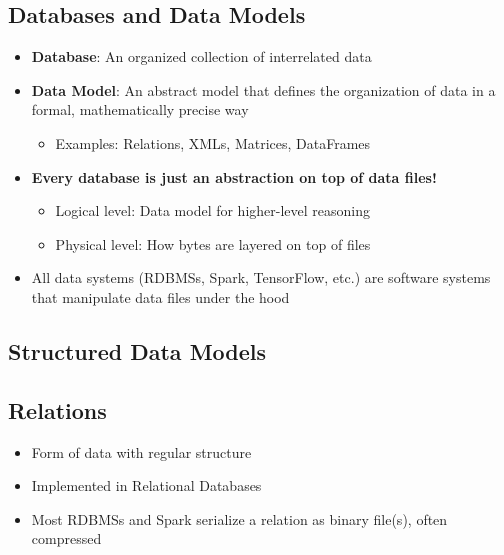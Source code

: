 \documentclass[12pt]{article}
\begin{document}
\subsection{Databases and Data Models}
\begin{tcolorbox}[colback=yellow!5!white,colframe=yellow!75!black,title={Key Insight}]
\begin{itemize}
    \item \textbf{Database}: An organized collection of interrelated data
    \item \textbf{Data Model}: An abstract model that defines the organization of data in a formal, mathematically precise way
    \begin{itemize}
        \item Examples: Relations, XMLs, Matrices, DataFrames
    \end{itemize}
    \item \textbf{Every database is just an abstraction on top of data files!}
    \begin{itemize}
        \item Logical level: Data model for higher-level reasoning
        \item Physical level: How bytes are layered on top of files
    \end{itemize}
    \item All data systems (RDBMSs, Spark, TensorFlow, etc.) are software systems that manipulate data files under the hood
\end{itemize}
\end{tcolorbox}

\subsection{Structured Data Models}

\subsection{Relations}
\begin{itemize}
    \item Form of data with regular structure
    \item Implemented in Relational Databases
    \item Most RDBMSs and Spark serialize a relation as binary file(s), often compressed
\end{itemize}
\end{document}
